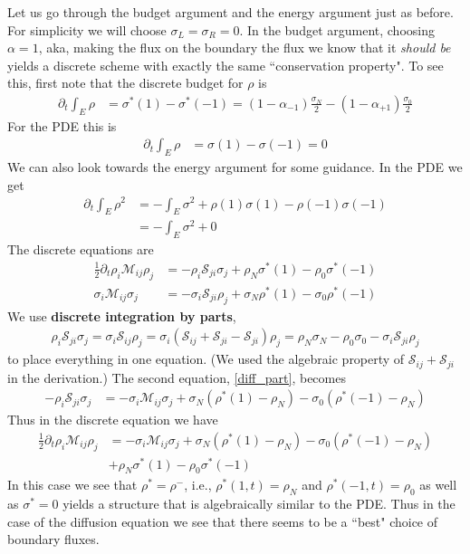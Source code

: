 \documentclass{report}
\numberwithin{equation}{section}
\begin{document}
Let us go through the budget argument and the energy argument just as before. For simplicity we will choose $\sigma_L = \sigma_R = 0$. In the budget argument, choosing $\alpha = 1$, aka, making the flux on the boundary the flux we know that it \textit{should be} yields a discrete scheme with exactly the same ``conservation property". To see this, first note that the discrete budget for $\rho$ is
\begin{align}
    \partial_t \int_{E} \rho &= \sigma^*(1) - \sigma^*(-1) = (1-\alpha_{-1})\frac{\sigma_N}{2} - (1-\alpha_{+1})\frac{\sigma_0}{2}
\end{align}
For the PDE this is
\begin{align}
\partial_t \int_{E} \rho &= \sigma(1) - \sigma(-1) = 0
\end{align}
We can also look towards the energy argument for some guidance. In the PDE we get
\begin{align}
    \partial_t \int_E \rho^2 &= - \int_E \sigma^2 + \rho(1) \sigma(1) - \rho(-1) \sigma(-1) \\
    &= - \int_E \sigma^2 + 0
\end{align}
The discrete equations are
\begin{align}
    \frac{1}{2} \partial_t \rho_i \mathcal{M}_{ij} \rho_j &= - \rho_i \mathcal{S}_{ji} \sigma_j + \rho_N \sigma^*(1) - \rho_0 \sigma^*(-1) \\
    \label{diff_part}
    \sigma_i \mathcal{M}_{ij} \sigma_j &= - \sigma_i \mathcal{S}_{ji} \rho_j + \sigma_N \rho^*(1) - \sigma_0 \rho^*(-1)
\end{align}
We use \textbf{discrete integration by parts},
\begin{align}
\rho_i \mathcal{S}_{ji} \sigma_j = \sigma_i \mathcal{S}_{ij} \rho_j =  \sigma_i (\mathcal{S}_{ij} +\mathcal{S}_{ji} - \mathcal{S}_{ji} ) \rho_j  = \rho_N \sigma_N - \rho_0 \sigma_0 - \sigma_i \mathcal{S}_{ji} \rho_j
\end{align}
to place everything in one equation. (We used the algebraic property of $\mathcal{S}_{ij}+\mathcal{S}_{ji}$ in the derivation.) The second equation, \ref{diff_part}, becomes  
\begin{align}
- \rho_i \mathcal{S}_{ji} \sigma_j &= 
- \sigma_i \mathcal{M}_{ij} \sigma_j  + \sigma_N (\rho^*(1) - \rho_N) - \sigma_0 (\rho^*(-1) - \rho_N)
\end{align}
Thus in the discrete equation we have
\begin{align}
    \frac{1}{2} \partial_t \rho_i \mathcal{M}_{ij} \rho_j &= -\sigma_i \mathcal{M}_{ij} \sigma_j + \sigma_N (\rho^*(1) - \rho_N) - \sigma_0 (\rho^*(-1) - \rho_N)  
    \\
    \nonumber
    &+ \rho_N \sigma^*(1) - \rho_0 \sigma^*(-1)
\end{align}
In this case we see that $\rho^* = \rho^-$, i.e., $\rho^*(1,t) = \rho_N$ and $\rho^*(-1,t) = \rho_0 $ as well as $\sigma^* = 0$ yields a structure that is algebraically similar to the PDE. Thus in the case of the diffusion equation we see that there seems to be a ``best" choice of boundary fluxes. 
\end{document}

